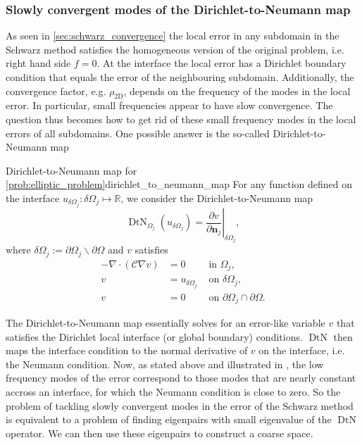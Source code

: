 \subsubsection{Slowly convergent modes of the Dirichlet-to-Neumann map}
As seen in \cref{sec:schwarz_convergence} the local error in any subdomain in the Schwarz method satisfies the homogeneous version of the original problem, i.e. right hand side $f = 0$. At the interface the local error has a Dirichlet boundary condition that equals the error of the neighbouring subdomain. Additionally, the convergence factor, e.g. $\rho_{\text{2D}}$, depends on the frequency of the modes in the local error. In particular, small frequencies appear to have slow convergence. The question thus becomes how to get rid of these small frequency modes in the local errors of all subdomains. One possible answer is the so-called Dirichlet-to-Neumann map \cite[Definition 5.1]{schwarz_methods_Dolean_2015}
\begin{fancydef}{Dirichlet-to-Neumann map for \cref{prob:elliptic_problem}}{dirichlet_to_neumann_map}
  For any function defined on the interface $u_{\delta\Omega_j}: \delta\Omega_j \mapsto \mathbb{R}$, we consider the Dirichlet-to-Neumann map
  \[
    \operatorname{DtN}_{\Omega_j}\left(u_{\delta\Omega_j}\right)=\left.\frac{\partial v}{\partial \mathbf{n}_j}\right|_{\delta\Omega_j},
  \]
  where $\delta\Omega_j:=\partial \Omega_j \backslash \partial \Omega$ and $v$ satisfies
  \begin{equation}
    \begin{aligned}
      -\nabla\cdot\left(\mathcal{C}\nabla v\right) & =0            & \text { in } \Omega_j,                               \\
      v                                            & =u_{\delta\Omega_j} & \text { on } \delta\Omega_j,                               \\
      v                                            & =0            & \text { on } \partial \Omega_j \cap \partial \Omega.
    \end{aligned}
    \label{eq:dirichlet_to_neumann_map_subproblem}
  \end{equation}
\end{fancydef}

The Dirichlet-to-Neumann map essentially solves for an error-like variable $v$ that satisfies the Dirichlet local interface (or global boundary) conditions. $\operatorname{DtN}$ then maps the interface condition to the normal derivative of $v$ on the interface, i.e. the Neumann condition. Now, as stated above and illustrated in \cite[Figure 5.2]{schwarz_methods_Dolean_2015}, the low frequency modes of the error correspond to those modes that are nearly constant accross an interface, for which the Neumann condition is close to zero. So the problem of tackling slowly convergent modes in the error of the Schwarz method is equivalent to a problem of finding eigenpairs with small eigenvalue of the $\operatorname{DtN}$ operator. We can then use these eigenpairs to construct a coarse space.

